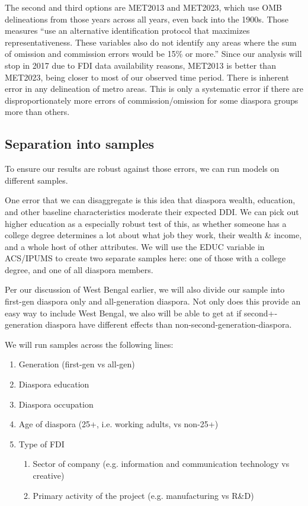 \documentclass[doublespace,nopageskip]{UVAthesis}
\begin{document}
The second and third options are MET2013 and MET2023, which use OMB delineations from those years across all years, even back into the 1900s. Those measures ``use an alternative identification protocol that maximizes representativeness. These variables also do not identify any areas where the sum of omission and commission errors would be 15\% or more.'' Since our analysis will stop in 2017 due to FDI data availability reasons, MET2013 is better than MET2023, being closer to most of our observed time period. There is inherent error in any delineation of metro areas. This is only a systematic error if there are disproportionately more errors of commission/omission for some diaspora groups more than others.


    \subsection{Separation into samples} \label{ss:samples}
    To ensure our results are robust against those errors, we can run models on different samples. 
    
    One error that we can disaggregate is this idea that diaspora wealth, education, and other baseline characteristics moderate their expected DDI. We can pick out higher education as a especially robust test of this, as whether someone has a college degree determines a lot about what job they work, their wealth \& income, and a whole host of other attributes. We will use the EDUC variable in ACS/IPUMS to create two separate samples here: one of those with a college degree, and one of all diaspora members.
    
    Per our discussion of West Bengal earlier, we will also divide our sample into first-gen diaspora only and all-generation diaspora. Not only does this provide an easy way to include West Bengal, we also will be able to get at if second+-generation diaspora have different effects than non-second-generation-diaspora. 
    
    We will run samples across the following lines:
\begin{enumerate}
    \item Generation (first-gen vs all-gen)
    \item Diaspora education
    \item Diaspora occupation
    \item Age of diaspora (25+, i.e. working adults, vs non-25+)
    \item Type of FDI
    \begin{enumerate}
        \item Sector of company (e.g. information and communication technology vs creative)
        \item Primary activity of the project (e.g. manufacturing vs R\&D)
    \end{enumerate}
\end{enumerate}
\end{document}
